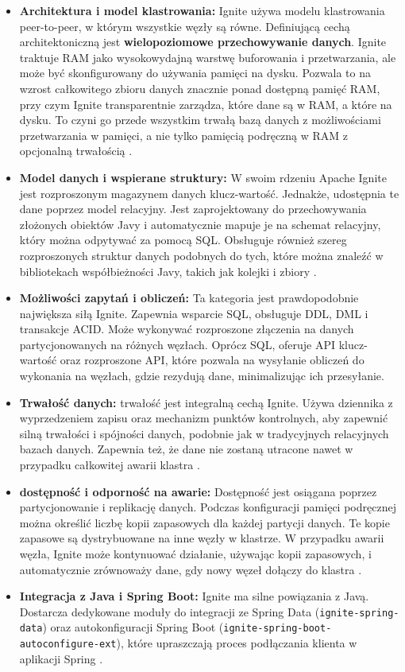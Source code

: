 \begin{itemize}
    \item \textbf{Architektura i model klastrowania:} Ignite używa modelu klastrowania peer-to-peer, w którym wszystkie węzły są równe. Definiującą cechą architektoniczną jest \textbf{wielopoziomowe przechowywanie danych}. Ignite traktuje RAM jako wysokowydajną warstwę buforowania i przetwarzania, ale może być skonfigurowany do używania pamięci na dysku. Pozwala to na wzrost całkowitego zbioru danych znacznie ponad dostępną pamięć RAM, przy czym Ignite transparentnie zarządza, które dane są w RAM, a które na dysku. To czyni go przede wszystkim trwałą bazą danych z możliwościami przetwarzania w pamięci, a nie tylko pamięcią podręczną w RAM z opcjonalną trwałością \cite{ignite-docs}.
    \item \textbf{Model danych i wspierane struktury:} W swoim rdzeniu Apache Ignite jest rozproszonym magazynem danych klucz-wartość. Jednakże, udostępnia te dane poprzez model relacyjny. Jest zaprojektowany do przechowywania złożonych obiektów Javy i automatycznie mapuje je na schemat relacyjny, który można odpytywać za pomocą SQL. Obsługuje również szereg rozproszonych struktur danych podobnych do tych, które można znaleźć w bibliotekach współbieżności Javy, takich jak kolejki i zbiory \cite{ignite_data_model}.
    \item \textbf{Możliwości zapytań i obliczeń:} Ta kategoria jest prawdopodobnie największa siłą Ignite. Zapewnia wsparcie SQL, obsługuje DDL, DML i transakcje ACID. Może wykonywać rozproszone złączenia na danych partycjonowanych na różnych węzłach\cite{ignite-docs}. Oprócz SQL, oferuje API klucz-wartość oraz rozproszone API, które pozwala na wysyłanie obliczeń do wykonania na węzłach, gdzie rezydują dane, minimalizując ich przesyłanie.
    \item \textbf{Trwałość danych:} trwałość jest integralną cechą Ignite. Używa dziennika z wyprzedzeniem zapisu oraz mechanizm punktów kontrolnych, aby zapewnić silną trwałości i spójności danych, podobnie jak w tradycyjnych relacyjnych bazach danych. Zapewnia też, że dane nie zostaną utracone nawet w przypadku całkowitej awarii klastra \cite{ignite-docs}.
    \item \textbf{dostępność i odporność na awarie:} Dostępność jest osiągana poprzez partycjonowanie i replikację danych. Podczas konfiguracji pamięci podręcznej można określić liczbę kopii zapasowych dla każdej partycji danych. Te kopie zapasowe są dystrybuowane na inne węzły w klastrze. W przypadku awarii węzła, Ignite może kontynuować działanie, używając kopii zapasowych, i automatycznie zrównoważy dane, gdy nowy węzeł dołączy do klastra \cite{ignite-docs}.
    \item \textbf{Integracja z Java i Spring Boot:} Ignite ma silne powiązania z  Javą. Dostarcza dedykowane moduły do integracji ze Spring Data (\texttt{ignite-spring-data}) oraz autokonfiguracji Spring Boot (\texttt{ignite-spring-boot-autoconfigure-ext}), które upraszczają proces podłączania klienta w aplikacji Spring \cite{spring-boot, spring-docs, ignite-docs}.
\end{itemize}

